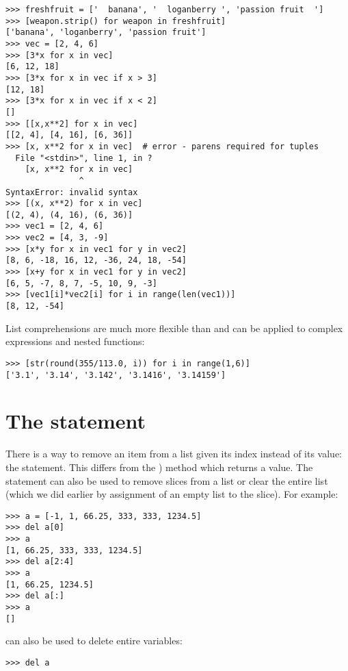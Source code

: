 \documentclass{manual}
\begin{document}
\begin{verbatim}
>>> freshfruit = ['  banana', '  loganberry ', 'passion fruit  ']
>>> [weapon.strip() for weapon in freshfruit]
['banana', 'loganberry', 'passion fruit']
>>> vec = [2, 4, 6]
>>> [3*x for x in vec]
[6, 12, 18]
>>> [3*x for x in vec if x > 3]
[12, 18]
>>> [3*x for x in vec if x < 2]
[]
>>> [[x,x**2] for x in vec]
[[2, 4], [4, 16], [6, 36]]
>>> [x, x**2 for x in vec]	# error - parens required for tuples
  File "<stdin>", line 1, in ?
    [x, x**2 for x in vec]
               ^
SyntaxError: invalid syntax
>>> [(x, x**2) for x in vec]
[(2, 4), (4, 16), (6, 36)]
>>> vec1 = [2, 4, 6]
>>> vec2 = [4, 3, -9]
>>> [x*y for x in vec1 for y in vec2]
[8, 6, -18, 16, 12, -36, 24, 18, -54]
>>> [x+y for x in vec1 for y in vec2]
[6, 5, -7, 8, 7, -5, 10, 9, -3]
>>> [vec1[i]*vec2[i] for i in range(len(vec1))]
[8, 12, -54]
\end{verbatim}

List comprehensions are much more flexible than  and can be
applied to complex expressions and nested functions:

\begin{verbatim}
>>> [str(round(355/113.0, i)) for i in range(1,6)]
['3.1', '3.14', '3.142', '3.1416', '3.14159']
\end{verbatim}


\section{The  statement \label{del}}

There is a way to remove an item from a list given its index instead
of its value: the  statement.  This differs from the
) method which returns a value.  The 
statement can also be used to remove slices from a list or clear the
entire list (which we did earlier by assignment of an empty list to
the slice).  For example:

\begin{verbatim}
>>> a = [-1, 1, 66.25, 333, 333, 1234.5]
>>> del a[0]
>>> a
[1, 66.25, 333, 333, 1234.5]
>>> del a[2:4]
>>> a
[1, 66.25, 1234.5]
>>> del a[:]
>>> a
[]
\end{verbatim}

 can also be used to delete entire variables:

\begin{verbatim}
>>> del a
\end{verbatim}
\end{document}
